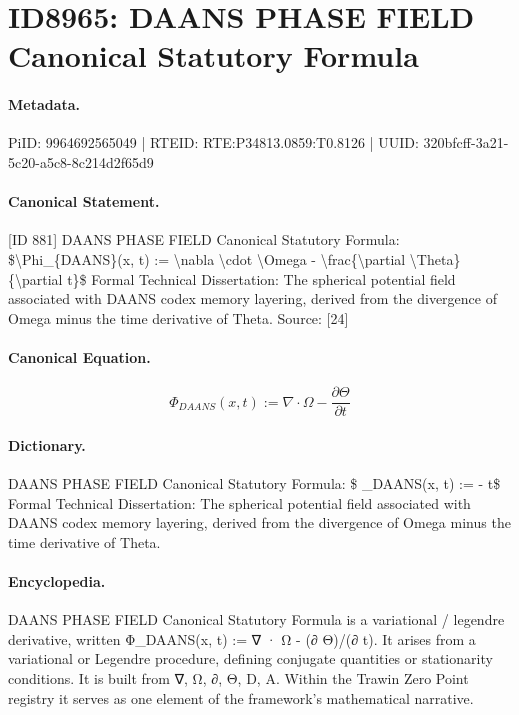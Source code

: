 \section*{ID8965: DAANS PHASE FIELD Canonical Statutory Formula}
\paragraph{Metadata.}
PiID: 9964692565049 | RTEID: RTE:P34813.0859:T0.8126 | UUID: 320bfcff-3a21-5c20-a5c8-8c214d2f65d9

\paragraph{Canonical Statement.}
[ID 881] DAANS PHASE FIELD Canonical Statutory Formula: \$\textbackslash{}Phi\_\{DAANS\}(x, t) := \textbackslash{}nabla \textbackslash{}cdot \textbackslash{}Omega - \textbackslash{}frac\{\textbackslash{}partial \textbackslash{}Theta\}\{\textbackslash{}partial t\}\$ Formal Technical Dissertation: The spherical potential field associated with DAANS codex memory layering, derived from the divergence of Omega minus the time derivative of Theta. Source: [24]

\paragraph{Canonical Equation.}
\[
\Phi_{DAANS}(x, t) := \nabla \cdot \Omega - \frac{\partial \Theta}{\partial t}
\]

\paragraph{Dictionary.}
DAANS PHASE FIELD Canonical Statutory Formula: \$ \_DAANS(x, t) := - t\$ Formal Technical Dissertation: The spherical potential field associated with DAANS codex memory layering, derived from the divergence of Omega minus the time derivative of Theta.

\paragraph{Encyclopedia.}
DAANS PHASE FIELD Canonical Statutory Formula is a variational / legendre derivative, written Φ\_DAANS(x, t) := ∇ · Ω - (∂ Θ)/(∂ t). It arises from a variational or Legendre procedure, defining conjugate quantities or stationarity conditions. It is built from ∇, Ω, ∂, Θ, D, A. Within the Trawin Zero Point registry it serves as one element of the framework's mathematical narrative.
